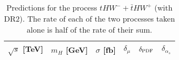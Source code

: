 \documentclass[a4paper,usenames,dvipsnames,11pt]{article}
\begin{document}
\begin{table}
    \centering
    \begin{tabular}{cccccc}
        $\sqrt{s}$ [TeV]  &  $m_H$ [GeV]  &  $\sigma$ [fb]  & $\delta_{\mu}$   &  $\delta_{\rm PDF}$   & $\delta_{\alpha_s}$\\
        \hline
    \end{tabular}
    \caption{\label{tab:thw-tot} Predictions for the process $tHW^- + \bar t HW^+$ (with DR2). The rate of each of the two processes taken alone is
half of the rate of their sum.}
\end{table}




\end{document}
